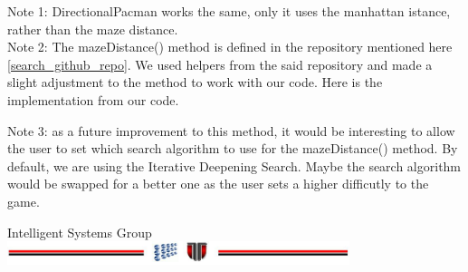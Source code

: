 \documentclass[a4paper,12pt]{report}
\begin{document}
\vspace{0.5cm}
\lstset{style=codeBoxStyle}

\vspace{0.5cm}
Note 1: DirectionalPacman works the same, only it uses the manhattan istance, rather than the maze distance.\\
Note 2: The mazeDistance() method is defined in the repository mentioned here \ref{search_github_repo}. We used
helpers from the said repository and made a slight adjustment to the method to work with our code. Here is the
implementation from our code.
\vspace{0.5cm}
\lstset{style=codeBoxStyle}

\vspace{0.5cm}
Note 3: as a future improvement to this method, it would be interesting to allow the user to set which search
algorithm to use for the mazeDistance() method. By default, we are using the Iterative Deepening Search. Maybe
the search algorithm would be swapped for a better one as the user sets a higher difficutly to the game.

\vspace{2cm}
\begin{center}
Intelligent Systems Group\\
\includegraphics[width=10cm]{fig/footer}
\end{center}
\end{document}

